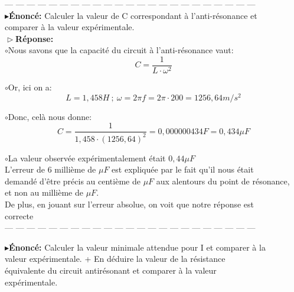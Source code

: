 \documentclass{report}
\begin{document}
--- --- --- --- --- --- --- --- --- --- --- --- --- --- --- --- --- --- --- --- --- --- --- \\

\textbf{$\blacktriangleright$\'Enonc\'e:} Calculer la valeur de C correspondant \`a l'anti-r\'esonance et \\
\hspace*{2,35cm}comparer \`a la valeur exp\'erimentale. \\

\textbf{$\vartriangleright$R\'eponse:} \\

$\circ$Nous savons que la capacit\'e du circuit \`a l'anti-r\'esonance vaut:
$$ C = \frac{1}{L \cdot \omega^{2}} $$ 

$\circ$Or, ici on a:
$$ L = 1,458H\ ;\ \omega = 2\pi f = 2\pi \cdot 200 = 1256,64m/s^{2} $$

$\circ$Donc, cel\`a nous donne:
$$ C = \frac{1}{1,458 \cdot (1256,64)^{2}} = 0,000000434F = 0,434\mu F $$

$\circ$La valeur observ\'ee exp\'erimentalement \'etait $0,44\mu F$\\
\hspace*{0.75cm}L'erreur de 6 milli\`eme de $\mu F$ est expliqu\'ee par le fait qu'il nous \'etait \\ 
\hspace*{0.75cm}demand\'e d'\^etre pr\'ecis au centi\`eme de $\mu F$ aux alentours du point de r\'esonance, \\
\hspace*{0.75cm}et non au milli\`eme de $\mu F$. \\
\hspace*{0.75cm}De plus, en jouant sur l'erreur absolue, on voit que notre r\'eponse est \\
\hspace*{0.75cm}correcte
~~\\

--- --- --- --- --- --- --- --- --- --- --- --- --- --- --- --- --- --- --- --- --- --- --- \\

\newpage

\textbf{$\blacktriangleright$\'Enonc\'e:} Calculer la valeur minimale attendue pour I et comparer \`a la \\
\hspace*{2,35cm}valeur exp\'erimentale. + En d\'eduire la valeur de la r\'esistance \\
\hspace*{2,35cm}\'equivalente du circuit antir\'esonant et comparer \`a la valeur \\
\hspace*{2,35cm}exp\'erimentale.\\
\end{document}
